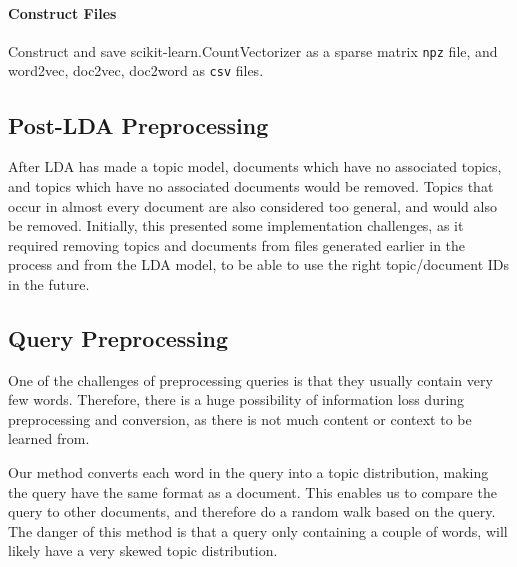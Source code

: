 \paragraph{Construct Files}
Construct and save scikit-learn.CountVectorizer as a sparse matrix \texttt{npz} file, and word2vec, doc2vec, doc2word as \texttt{csv} files.


\subsection{Post-LDA Preprocessing}
After LDA has made a topic model, documents which have no associated topics, and topics which have no associated documents would be removed.
Topics that occur in almost every document are also considered too general, and would also be removed. 
Initially, this presented some implementation challenges, as it required removing topics and documents from files generated earlier in the process and from the LDA model, to be able to use the right topic/document IDs in the future.

\subsection{Query Preprocessing}
One of the challenges of preprocessing queries is that they usually contain very few words.
Therefore, there is a huge possibility of information loss during preprocessing and conversion, as there is not much content or context to be learned from.

Our method converts each word in the query into a topic distribution, making the query have the same format as a document. 
This enables us to compare the query to other documents, and therefore do a random walk based on the query.
The danger of this method is that a query only containing a couple of words, will likely have a very skewed topic distribution.
